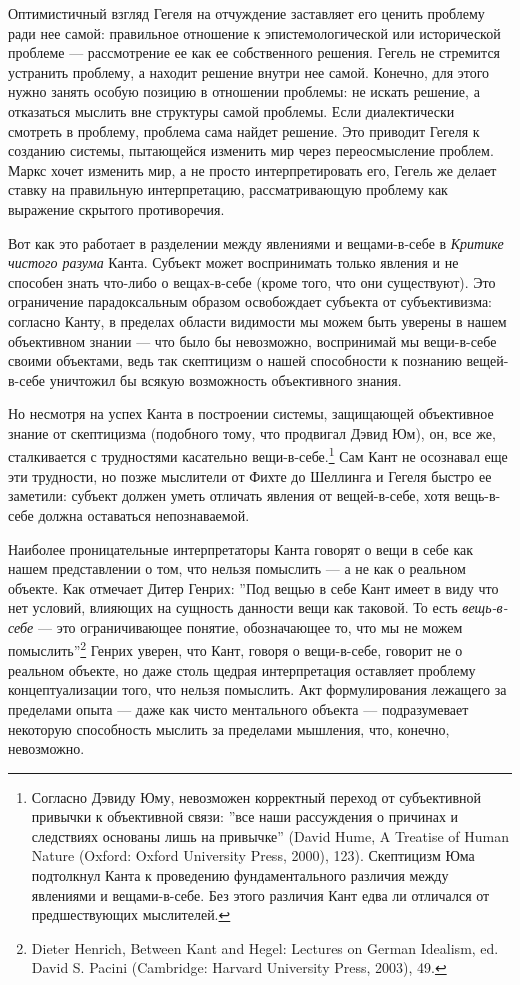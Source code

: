 \documentclass[12pt]{book}
\begin{document}
Оптимистичный взгляд Гегеля на отчуждение заставляет его ценить проблему ради нее самой: правильное отношение к эпистемологической или исторической проблеме --- рассмотрение ее как ее собственного решения. Гегель не стремится устранить проблему, а находит решение внутри нее самой. Конечно, для этого нужно занять особую позицию в отношении проблемы: не искать решение, а отказаться мыслить вне структуры самой проблемы. Если диалектически смотреть в проблему, проблема сама найдет решение. Это приводит Гегеля к созданию системы, пытающейся изменить мир через переосмысление проблем. Маркс хочет изменить мир, а не просто интерпретировать его, Гегель же делает ставку на правильную интерпретацию, рассматривающую проблему как выражение скрытого противоречия.

Вот как это работает в разделении между явлениями и вещами-в-себе в \textit{Критике чистого разума} Канта. Субъект может воспринимать только явления и не способен знать что-либо о вещах-в-себе (кроме того, что они существуют). Это ограничение парадоксальным образом освобождает субъекта от субъективизма: согласно Канту, в пределах области видимости мы можем быть уверены в нашем объективном знании --- что было бы невозможно, воспринимай мы вещи-в-себе своими объектами, ведь так скептицизм о нашей способности к познанию вещей-в-себе уничтожил бы всякую возможность объективного знания.

Но несмотря на успех Канта в построении системы, защищающей объективное знание от скептицизма (подобного тому, что продвигал Дэвид Юм), он, все же, сталкивается с трудностями касательно вещи-в-себе.\footnote{Согласно Дэвиду Юму, невозможен корректный переход от субъективной привычки к объективной связи: ''все наши рассуждения о причинах и следствиях основаны лишь на привычке'' (David Hume, A Treatise of Human Nature (Oxford: Oxford University Press, 2000), 123). Скептицизм Юма подтолкнул Канта к проведению фундаментального различия между явлениями и вещами-в-себе. Без этого различия Кант едва ли отличался от предшествующих мыслителей.} Сам Кант не осознавал еще эти трудности, но позже мыслители от Фихте до Шеллинга и Гегеля быстро ее заметили: субъект должен уметь отличать явления от вещей-в-себе, хотя вещь-в-себе должна оставаться непознаваемой.

Наиболее проницательные интерпретаторы Канта говорят о вещи в себе как нашем представлении о том, что нельзя помыслить --- а не как о реальном объекте. Как отмечает Дитер Генрих: ''Под вещью в себе Кант имеет в виду что нет условий, влияющих на сущность данности вещи как таковой. То есть \textit{вещь-в-себе} --- это ограничивающее понятие, обозначающее то, что мы не можем помыслить''\footnote{Dieter Henrich, Between Kant and Hegel: Lectures on German Idealism, ed. David S. Pacini (Cambridge: Harvard University Press, 2003), 49.} Генрих уверен, что Кант, говоря о вещи-в-себе, говорит не о реальном объекте, но даже столь щедрая интерпретация оставляет проблему концептуализации того, что нельзя помыслить. Акт формулирования лежащего за пределами опыта --- даже как чисто ментального объекта --- подразумевает некоторую способность мыслить за пределами мышления, что, конечно, невозможно.
\end{document}
